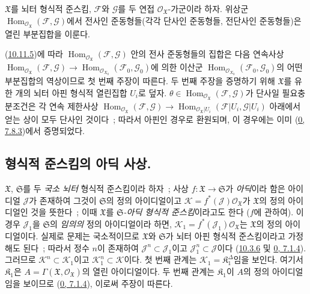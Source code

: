 \begin{proposition}[10.11.9]
\label{I.10.11.9-ko}
$\mathfrak{X}$를 뇌터 형식적 준스킴,
$\mathscr{F}$와 $\mathscr{G}$를 두 연접
$\mathscr{O}_{\mathfrak{X}}$-가군이라 하자. 위상군
$\operatorname{Hom}_{\mathscr{O}_{\mathfrak{X}}}
(\mathscr{F},\mathscr{G})$에서 전사인 준동형들(각각 단사인 준동형들,
전단사인 준동형들)은 열린 부분집합을 이룬다.
\end{proposition}

(\hyperref[I.10.11.5-ko]{10.11.5})에 따라
$\operatorname{Hom}_{\mathscr{O}_{\mathfrak{X}}}
(\mathscr{F},\mathscr{G})$ 안의 전사 준동형들의 집합은 다음 연속사상
$\operatorname{Hom}_{\mathscr{O}_{\mathfrak{X}}}
(\mathscr{F},\mathscr{G})\to\allowbreak
\operatorname{Hom}_{\mathscr{O}_{X_0}}(\mathscr{F}_0,\mathscr{G}_0)$에
의한 이산군
$\operatorname{Hom}_{\mathscr{O}_{X_0}}(\mathscr{F}_0,\mathscr{G}_0)$의
어떤 부분집합의 역상이므로 첫 번째 주장이 따른다. 두 번째 주장을
증명하기 위해 $\mathfrak{X}$를 유한 개의 뇌터 아핀 형식적 열린집합
$U_i$로 덮자. $\theta\in
\operatorname{Hom}_{\mathscr{O}_{\mathfrak{X}}}
(\mathscr{F},\mathscr{G})$가 단사일 필요충분조건은 각 연속 제한사상
$\operatorname{Hom}_{\mathscr{O}_{\mathfrak{X}}}
(\mathscr{F},\mathscr{G})\to
\operatorname{Hom}_{\mathscr{O}_{\mathfrak{X}}|U_i}
(\mathscr{F}|U_i,\mathscr{G}|U_i)$ 아래에서 얻는 상이 모두 단사인 것이다~;
따라서 아핀인 경우로 환원되며, 이 경우에는 이미
(\hyperref[0.7.8.3-ko]{0, 7.8.3})에서 증명되었다.


\subsection{형식적 준스킴의 아딕 사상.}
\label{subsection:I.10.12-ko}

\begin{env}[10.12.1]
\label{I.10.12.1-ko}
$\mathfrak{X}$, $\mathfrak{S}$를 두 \emph{국소 뇌터} 형식적
준스킴이라 하자~; 사상 $f:\mathfrak{X}\to\mathfrak{S}$가
\emph{아딕}이라 함은 아이디얼 $\mathscr{J}$가 존재하여 그것이
$\mathfrak{S}$의 정의 아이디얼이고
$\mathscr{K}=f^*(\mathscr{J})\mathscr{O}_{\mathfrak{X}}$가
$\mathfrak{X}$의 정의 아이디얼인 것을 뜻한다~; 이때
$\mathfrak{X}$를
\emph{$\mathfrak{S}$-아딕 형식적 준스킴}이라고도 한다
($f$에 관하여). 이 경우 $\mathscr{J}_1$을 $\mathfrak{S}$의
\emph{임의의} 정의 아이디얼이라 하면,
$\mathscr{K}_1=f^*(\mathscr{J}_1)\mathscr{O}_{\mathfrak{X}}$는
$\mathfrak{X}$의 정의 아이디얼이다. 실제로 문제는 국소적이므로
$\mathfrak{X}$와 $\mathfrak{S}$가 뇌터 아핀 형식적 준스킴이라고
가정해도 된다~; 따라서 정수 $n$이 존재하여
$\mathscr{J}^n\subset\mathscr{J}_1$이고
$\mathscr{J}_1^n\subset\mathscr{J}$이다
(\hyperref[I.10.3.6-ko]{10.3.6} 및
\hyperref[0.7.1.4-ko]{0, 7.1.4}). 그러므로
$\mathscr{K}^n\subset\mathscr{K}_1$이고
$\mathscr{K}_1^n\subset\mathscr{K}$이다. 첫 번째 관계는
$\mathscr{K}_1=\mathfrak{K}_1^\Delta$임을 보인다. 여기서
$\mathfrak{K}_1$은
$A=\Gamma(\mathfrak{X},\mathscr{O}_{\mathfrak{X}})$의 열린
아이디얼이다. 두 번째 관계는 $\mathfrak{K}_1$이 $A$의 정의
아이디얼임을 보이므로
(\hyperref[0.7.1.4-ko]{0, 7.1.4}), 이로써 주장이 따른다.
\end{env}

